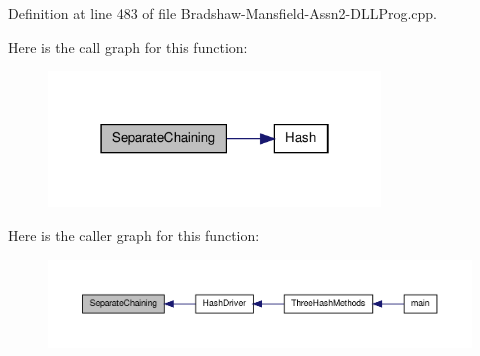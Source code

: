 Definition at line 483 of file Bradshaw-\/Mansfield-\/Assn2-\/DLLProg.cpp.



Here is the call graph for this function:
\nopagebreak
\begin{figure}[H]
\begin{center}
\leavevmode
\includegraphics[width=250pt]{_bradshaw-_mansfield-_assn2-_d_l_l_prog_8cpp_a3c6053c6e80957893d4a9bb2bb0dc221_cgraph}
\end{center}
\end{figure}




Here is the caller graph for this function:
\nopagebreak
\begin{figure}[H]
\begin{center}
\leavevmode
\includegraphics[width=400pt]{_bradshaw-_mansfield-_assn2-_d_l_l_prog_8cpp_a3c6053c6e80957893d4a9bb2bb0dc221_icgraph}
\end{center}
\end{figure}


